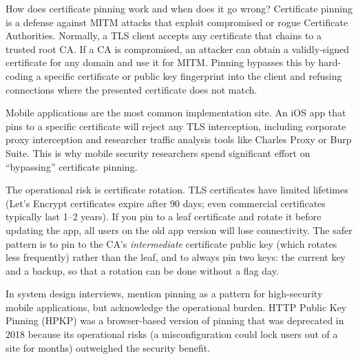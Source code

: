 \documentclass[11pt,a4paper]{article}
\begin{document}
\begin{curiobox}{How does certificate pinning work and when does it go wrong?}
Certificate pinning is a defense against MITM attacks that exploit compromised or rogue Certificate Authorities. Normally, a TLS client accepts any certificate that chains to a trusted root CA. If a CA is compromised, an attacker can obtain a validly-signed certificate for any domain and use it for MITM. Pinning bypasses this by hard-coding a specific certificate or public key fingerprint into the client and refusing connections where the presented certificate does not match.

Mobile applications are the most common implementation site. An iOS app that pins to a specific certificate will reject any TLS interception, including corporate proxy interception and researcher traffic analysis tools like Charles Proxy or Burp Suite. This is why mobile security researchers spend significant effort on ``bypassing'' certificate pinning.

The operational risk is certificate rotation. TLS certificates have limited lifetimes (Let's Encrypt certificates expire after 90 days; even commercial certificates typically last 1--2 years). If you pin to a leaf certificate and rotate it before updating the app, all users on the old app version will lose connectivity. The safer pattern is to pin to the CA's \textit{intermediate} certificate public key (which rotates less frequently) rather than the leaf, and to always pin two keys: the current key and a backup, so that a rotation can be done without a flag day.

In system design interviews, mention pinning as a pattern for high-security mobile applications, but acknowledge the operational burden. HTTP Public Key Pinning (HPKP) was a browser-based version of pinning that was deprecated in 2018 because its operational risks (a misconfiguration could lock users out of a site for months) outweighed the security benefit.
\end{curiobox}
\end{document}
